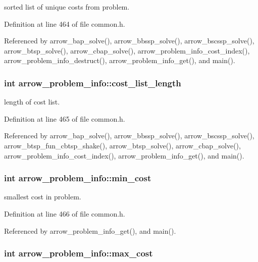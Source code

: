 sorted list of unique costs from problem. 

Definition at line 464 of file common.h.

Referenced by arrow\_\-bap\_\-solve(), arrow\_\-bbssp\_\-solve(), arrow\_\-bscssp\_\-solve(), arrow\_\-btsp\_\-solve(), arrow\_\-cbap\_\-solve(), arrow\_\-problem\_\-info\_\-cost\_\-index(), arrow\_\-problem\_\-info\_\-destruct(), arrow\_\-problem\_\-info\_\-get(), and main().\hypertarget{structarrow__problem__info_54bbdc187af19361072480b45016f171}{
\subsubsection{\setlength{\rightskip}{0pt plus 5cm}int {\bf arrow\_\-problem\_\-info::cost\_\-list\_\-length}}}
\label{structarrow__problem__info_54bbdc187af19361072480b45016f171}


length of cost list. 

Definition at line 465 of file common.h.

Referenced by arrow\_\-bap\_\-solve(), arrow\_\-bbssp\_\-solve(), arrow\_\-bscssp\_\-solve(), arrow\_\-btsp\_\-fun\_\-cbtsp\_\-shake(), arrow\_\-btsp\_\-solve(), arrow\_\-cbap\_\-solve(), arrow\_\-problem\_\-info\_\-cost\_\-index(), arrow\_\-problem\_\-info\_\-get(), and main().\hypertarget{structarrow__problem__info_46fabcc0ccd3a732cebb014331d4eeb5}{
\subsubsection{\setlength{\rightskip}{0pt plus 5cm}int {\bf arrow\_\-problem\_\-info::min\_\-cost}}}
\label{structarrow__problem__info_46fabcc0ccd3a732cebb014331d4eeb5}


smallest cost in problem. 

Definition at line 466 of file common.h.

Referenced by arrow\_\-problem\_\-info\_\-get(), and main().\hypertarget{structarrow__problem__info_724060f3be25521cca761899913c2776}{
\subsubsection{\setlength{\rightskip}{0pt plus 5cm}int {\bf arrow\_\-problem\_\-info::max\_\-cost}}}
\label{structarrow__problem__info_724060f3be25521cca761899913c2776}


